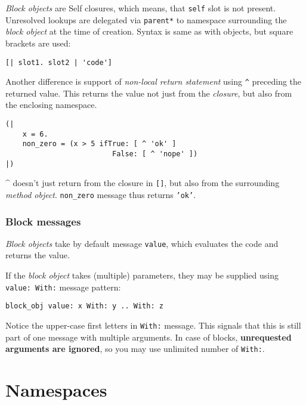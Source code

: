 \documentclass[10pt]{article}
\begin{document}
\begin{multicols*}{3}
\textit{Block objects} are Self closures, which means, that \texttt{self} slot is not present. Unresolved lookups are delegated via \texttt{parent*} to namespace surrounding the \textit{block object} at the time of creation. Syntax is same as with objects, but square brackets are used:

\begin{lstlisting}
[| slot1. slot2 | 'code']
\end{lstlisting}


Another difference is support of \textit{non-local return statement} using \texttt{\^} preceding the returned value. This returns the value not just from the \textit{closure}, but also from the enclosing namespace.

\begin{lstlisting}
(|
    x = 6.
    non_zero = (x > 5 ifTrue: [ ^ 'ok' ]
                         False: [ ^ 'nope' ])
|)
\end{lstlisting}

\^{} doesn't just return from the closure in \texttt{[]}, but also from the surrounding \textit{method object}. \texttt{non\_zero} message thus returns \texttt{'ok'}.



\subsubsection{Block messages}

\textit{Block objects} take by default message \texttt{value}, which evaluates the code and returns the value.

If the \textit{block object} takes (multiple) parameters, they may be supplied using \texttt{value:\ With:} message pattern:

\begin{lstlisting}
block_obj value: x With: y .. With: z
\end{lstlisting}

Notice the upper-case first letters in \texttt{With:} message. This signals that this is still part of one message with multiple arguments. In case of blocks, \textbf{unrequested arguments are ignored}, so you may use unlimited number of \texttt{With:}.




\pagebreak %
\section{Namespaces}


\end{multicols*}
\end{document}
